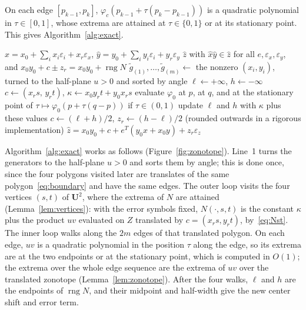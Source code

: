 \documentclass[10pt]{article}
\theoremstyle{definition}
\newcommand{\U}{\mathbf{U}}
\newcommand{\eps}{\varepsilon}
\newcommand{\ex}{\eps_x}
\newcommand{\ey}{\eps_y}
\newcommand{\rng}{\operatorname{rng}}
\begin{document}
On each edge $[p_{k-1},p_k]$, $\varphi_c(p_{k-1}+\tau(p_k-p_{k-1}))$ is a quadratic polynomial in $\tau\in[0,1]$, whose extrema are attained at $\tau\in\{0,1\}$ or at its stationary point. This gives Algorithm~\ref{alg:exact}.

\begin{algorithm}[H]
\caption{Exact multiplication of reduced affine forms}
\label{alg:exact}
\begin{algorithmic}[1]
\Require $\hat x = x_0+\sum_ix_i\eps_i+x_r\ex$, $\hat y = y_0+\sum_iy_i\eps_i+y_r\ey$
\Ensure $\hat z$ with $\hat x\hat y\in\hat z$ for all $e,\ex,\ey$, and $x_0y_0+c\pm z_r = x_0y_0+\rng N$
\State $\tilde g_{(1)},\dots,\tilde g_{(m)}\gets$ the nonzero $(x_i,y_i)$, turned to the half-plane $u>0$ and sorted by angle
\State $\ell\gets+\infty$, $h\gets-\infty$
  \State $c\gets(x_rs,\,y_rt)$, $\kappa\gets x_0y_rt+y_0x_rs$
    \State evaluate $\varphi_0$ at $p$, at $q$, and at the stationary point of $\tau\mapsto\varphi_0(p+\tau(q-p))$ if $\tau\in(0,1)$
    \State update $\ell$ and $h$ with $\kappa$ plus these values
  \EndFor
\EndFor
\State $c\gets(\ell+h)/2$, $z_r\gets(h-\ell)/2$ (rounded outwards in a rigorous implementation)
\State \Return $\hat z = x_0y_0+c+e^T(y_0x+x_0y)+z_r\eps_z$
\end{algorithmic}
\end{algorithm}

Algorithm~\ref{alg:exact} works as follows (Figure~\ref{fig:zonotope}). Line~1 turns the generators to the half-plane $u>0$ and sorts them by angle; this is done once, since the four polygons visited later are translates of the same polygon~\eqref{eq:boundary} and have the same edges. The outer loop visits the four vertices $(s,t)$ of $\U^2$, where the extrema of $N$ are attained (Lemma~\ref{lem:vertices}): with the error symbols fixed, $N(\cdot,s,t)$ is the constant $\kappa$ plus the product $uv$ evaluated on $Z$ translated by $c=(x_rs,y_rt)$, by~\eqref{eq:Nst}. The inner loop walks along the $2m$ edges of that translated polygon. On each edge, $uv$ is a quadratic polynomial in the position $\tau$ along the edge, so its extrema are at the two endpoints or at the stationary point, which is computed in $O(1)$; the extrema over the whole edge sequence are the extrema of $uv$ over the translated zonotope (Lemma~\ref{lem:zonotope}). After the four walks, $\ell$ and $h$ are the endpoints of $\rng N$, and their midpoint and half-width give the new center shift and error term.
\end{document}
